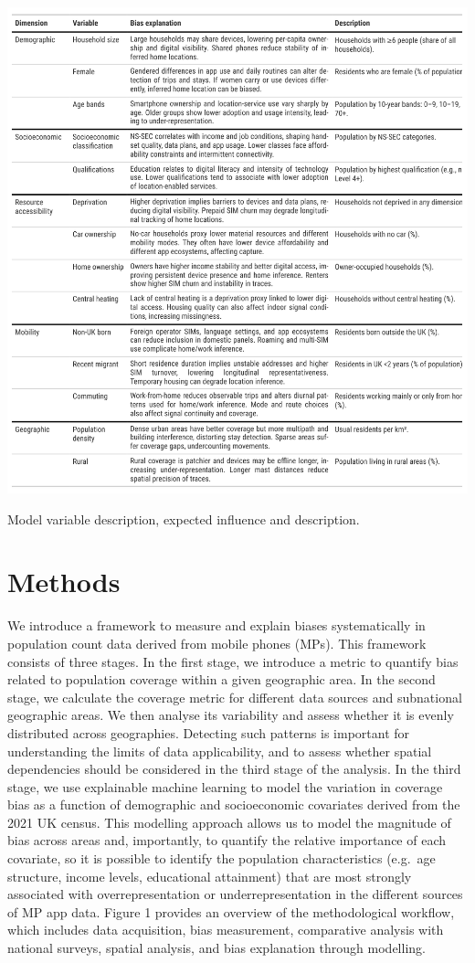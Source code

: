 \documentclass[]{rsos}%
\begin{document}
\begin{table}[h]
\centering
\includegraphics[width=1\linewidth]{figures/01_table-variable-dictionary_explain.png}
\caption{Model variable description, expected influence and description.}
\label{tab:covariates}
\end{table}

\section{Methods}\label{methods}

We introduce a framework to measure and explain biases systematically in
population count data derived from mobile phones (MPs). This framework
consists of three stages. In the first stage, we introduce a metric to
quantify bias related to population coverage within a given geographic
area. In the second stage, we calculate the coverage metric for
different data sources and subnational geographic areas. We then analyse
its variability and assess whether it is evenly distributed across
geographies. Detecting such patterns is important for understanding the
limits of data applicability, and to assess whether spatial dependencies
should be considered in the third stage of the analysis. In the third
stage, we use explainable machine learning to model the variation in
coverage bias as a function of demographic and socioeconomic covariates
derived from the 2021 UK census. This modelling approach allows us to
model the magnitude of bias across areas and, importantly, to quantify
the relative importance of each covariate, so it is possible to identify
the population characteristics (e.g.~age structure, income levels,
educational attainment) that are most strongly associated with
overrepresentation or underrepresentation in the different sources of MP
app data. Figure 1 provides an overview of the methodological workflow,
which includes data acquisition, bias measurement, comparative analysis
with national surveys, spatial analysis, and bias explanation through
modelling.
\end{document}
